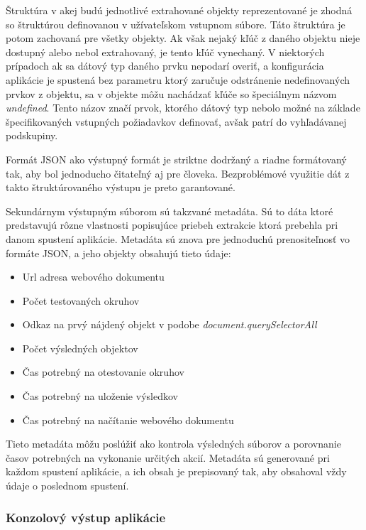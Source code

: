 \bigskip

Štruktúra v akej budú jednotlivé extrahované objekty reprezentované je zhodná so štruktúrou definovanou v užívateľskom vstupnom súbore. Táto štruktúra je potom zachovaná pre všetky objekty. Ak však nejaký kľúč z daného objektu nieje dostupný alebo nebol extrahovaný, je tento kľúč vynechaný. V niektorých prípadoch ak sa dátový typ daného prvku nepodarí overiť, a konfigurácia aplikácie je spustená bez parametru ktorý zaručuje odstránenie nedefinovaných prvkov z objektu, sa v objekte môžu nachádzať kľúče so špeciálnym názvom \textit{undefined}. Tento názov značí prvok, ktorého dátový typ nebolo možné na základe špecifikovaných vstupných požiadavkov definovať, avšak patrí do vyhľadávanej podskupiny.

Formát JSON ako výstupný formát je striktne dodržaný a riadne formátovaný tak, aby bol jednoducho čitateľný aj pre človeka. Bezproblémové využitie dát z takto štruktúrovaného výstupu je preto garantované.

\bigskip

Sekundárnym výstupným súborom sú takzvané metadáta. Sú to dáta ktoré predstavujú rôzne vlastnosti popisujúce priebeh extrakcie ktorá prebehla pri danom spustení aplikácie. Metadáta sú znova pre jednoduchú prenositeľnosť vo formáte JSON, a jeho objekty obsahujú tieto údaje:

\begin{itemize}
    \item {Url adresa webového dokumentu}
    \item {Počet testovaných okruhov}
    \item {Odkaz na prvý nájdený objekt v podobe \textit{document.querySelectorAll}}
    \item {Počet výsledných objektov}
    \item {Čas potrebný na otestovanie okruhov}
    \item {Čas potrebný na uloženie výsledkov}
    \item {Čas potrebný na načítanie webového dokumentu}
\end{itemize}

\bigskip

Tieto metadáta môžu poslúžiť ako kontrola výsledných súborov a porovnanie časov potrebných na vykonanie určitých akcií. Metadáta sú generované pri každom spustení aplikácie, a ich obsah je prepisovaný tak, aby obsahoval vždy údaje o poslednom spustení.


\subsubsection{Konzolový výstup aplikácie}

